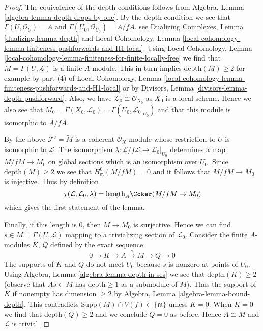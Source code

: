 \begin{proof}
The equivalence of the depth conditions follows from
Algebra, Lemma \ref{algebra-lemma-depth-drops-by-one}.
By the depth condition we see that
$\Gamma(U, \mathcal{O}_U) = A$ and
$\Gamma(U_0, \mathcal{O}_{U_0}) = A/fA$, see
Dualizing Complexes, Lemma \ref{dualizing-lemma-depth} and
Local Cohomology, Lemma
\ref{local-cohomology-lemma-finiteness-pushforwards-and-H1-local}.
Using Local Cohomology, Lemma
\ref{local-cohomology-lemma-finiteness-for-finite-locally-free}
we find that $M = \Gamma(U, \mathcal{L})$ is a finite $A$-module.
This in turn implies $\text{depth}(M) \geq 2$ for example by
part (4) of Local Cohomology, Lemma
\ref{local-cohomology-lemma-finiteness-pushforwards-and-H1-local}
or by Divisors, Lemma \ref{divisors-lemma-depth-pushforward}.
Also, we have $\mathcal{L}_0 \cong \mathcal{O}_{X_0}$
as $X_0$ is a local scheme. Hence we also see that
$M_0 = \Gamma(X_0, \mathcal{L}_0) = \Gamma(U_0, \mathcal{L}_0|_{U_0})$
and that this module is isomorphic to $A/fA$.

\medskip\noindent
By the above $\mathcal{F}' = \widetilde{M}$ is a coherent
$\mathcal{O}_X$-module whose restriction to $U$ is isomorphic to $\mathcal{L}$.
The isomorphism $\lambda : \mathcal{L}/f\mathcal{L} \to \mathcal{L}_0|_{U_0}$
determines a map $M/fM \to M_0$ on global sections
which is an isomorphism over $U_0$.
Since $\text{depth}(M) \geq 2$ we see
that $H^0_\mathfrak m(M/fM) = 0$ and it follows that
$M/fM \to M_0$ is injective. Thus by definition
$$
\chi(\mathcal{L}, \mathcal{L}_0, \lambda) =
\text{length}_A \Coker(M/fM \to M_0)
$$
which gives the first statement of the lemma.

\medskip\noindent
Finally, if this length is $0$, then $M \to M_0$ is surjective.
Hence we can find $s \in M = \Gamma(U, \mathcal{L})$
mapping to a trivializing section of $\mathcal{L}_0$.
Consider the finite $A$-modules $K$, $Q$ defined by the exact
sequence
$$
0 \to K \to A \xrightarrow{s} M \to Q \to 0
$$
The supports of $K$ and $Q$ do not meet $U_0$ because $s$
is nonzero at points of $U_0$. Using
Algebra, Lemma \ref{algebra-lemma-depth-in-ses}
we see that $\text{depth}(K) \geq 2$ (observe that
$As \subset M$ has $\text{depth} \geq 1$ as a submodule of $M$).
Thus the support of $K$ if nonempty has dimension $\geq 2$ by
Algebra, Lemma \ref{algebra-lemma-bound-depth}.
This contradicts $\text{Supp}(M) \cap V(f) \subset \{\mathfrak m\}$
unless $K = 0$. When $K = 0$ we find that
$\text{depth}(Q) \geq 2$ and we conclude
$Q = 0$ as before. Hence $A \cong M$ and
$\mathcal{L}$ is trivial.
\end{proof}







